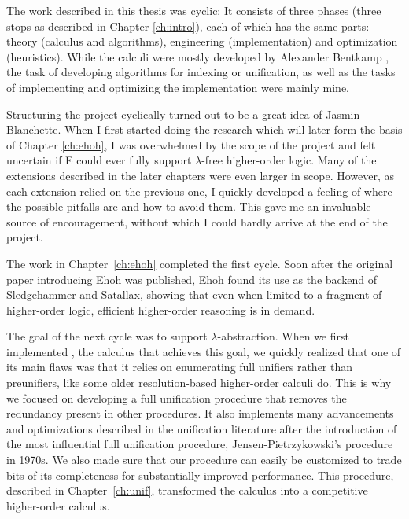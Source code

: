 The work described in this thesis
was cyclic: It consists of three phases (three stops as described in
Chapter \ref{ch:intro}), each of which has the same parts: theory (calculus and
algorithms), engineering (implementation) and optimization (heuristics). While
the calculi were mostly developed by Alexander Bentkamp
\cite{bbcw-21-lfho,bbtvw-21-sup-lam,bbtv-21-full-ho-sup}, the task of developing
algorithms for indexing or unification, as well as the tasks of implementing and
optimizing the implementation were mainly mine.

Structuring the project cyclically turned out to be a great idea of Jasmin
Blanchette. When I first started doing the research which will later form the
basis of Chapter \ref{ch:ehoh}, I was overwhelmed by the scope of the project
and felt uncertain if E could ever fully support $\lambda$-free higher-order
logic. Many of the extensions described in the later chapters were even larger
in scope. However, as each extension relied on the previous one, I quickly
developed a feeling of where the possible pitfalls are and how to avoid them.
This gave me an invaluable source of encouragement, without which I could hardly
arrive at the end of the project.

The work in Chapter~\ref{ch:ehoh} completed the first cycle. Soon after the
original paper introducing Ehoh \cite{vbss-19-ehoh1} was published, Ehoh found
its use as the backend of Sledgehammer and Satallax, showing that even when
limited to a fragment of higher-order logic, efficient higher-order reasoning is
in demand.

The goal of the next cycle was to support $\lambda$-abstraction. When we first
implemented \lsup{}, the calculus that achieves this goal, we quickly realized that
one of its main flaws was that it relies on enumerating full unifiers rather
than preunifiers, like some older resolution-based higher-order calculi do. This
is why we focused on developing a full unification procedure that removes the
redundancy present in other procedures. It also implements many advancements
and optimizations described in the unification literature after the introduction
of the most influential full unification procedure, Jensen-Pietrzykowski's
procedure in 1970s. We also made sure that our procedure can easily be customized to
trade bits of its completeness for substantially improved performance. This
procedure, described in Chapter~\ref{ch:unif}, transformed the \lsup{} calculus
into a competitive higher-order calculus.

